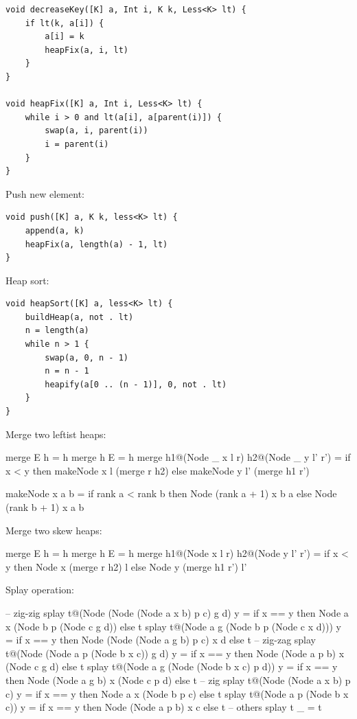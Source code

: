 \documentclass[b5paper]{article}
\begin{document}
\begin{lstlisting}[language = Bourbaki]
void decreaseKey([K] a, Int i, K k, Less<K> lt) {
    if lt(k, a[i]) {
        a[i] = k
        heapFix(a, i, lt)
    }
}

void heapFix([K] a, Int i, Less<K> lt) {
    while i > 0 and lt(a[i], a[parent(i)]) {
        swap(a, i, parent(i))
        i = parent(i)
    }
}
\end{lstlisting}

Push new element:

\begin{lstlisting}[language = Bourbaki]
void push([K] a, K k, less<K> lt) {
    append(a, k)
    heapFix(a, length(a) - 1, lt)
}
\end{lstlisting}

Heap sort:

\begin{lstlisting}[language = Bourbaki]
void heapSort([K] a, less<K> lt) {
    buildHeap(a, not . lt)
    n = length(a)
    while n > 1 {
        swap(a, 0, n - 1)
        n = n - 1
        heapify(a[0 .. (n - 1)], 0, not . lt)
    }
}
\end{lstlisting}

Merge two leftist heaps:

\begin{Haskell}
merge E h = h
merge h E = h
merge h1@(Node _ x l r) h2@(Node _ y l' r') =
    if x < y then makeNode x l (merge r h2)
    else makeNode y l' (merge h1 r')

makeNode x a b = if rank a < rank b then Node (rank a + 1) x b a
                 else Node (rank b + 1) x a b
\end{Haskell}

Merge two skew heaps:

\begin{Haskell}
merge E h = h
merge h E = h
merge h1@(Node x l r) h2@(Node y l' r') =
    if x < y then Node x (merge r h2) l
    else Node y (merge h1 r') l'
\end{Haskell}

Splay operation:

\begin{Haskell}
-- zig-zig
splay t@(Node (Node (Node a x b) p c) g d) y =
    if x == y then Node a x (Node b p (Node c g d)) else t
splay t@(Node a g (Node b p (Node c x d))) y =
    if x == y then Node (Node (Node a g b) p c) x d else t
-- zig-zag
splay t@(Node (Node a p (Node b x c)) g d) y =
    if x == y then Node (Node a p b) x (Node c g d) else t
splay t@(Node a g (Node (Node b x c) p d)) y =
    if x == y then Node (Node a g b) x (Node c p d) else t
-- zig
splay t@(Node (Node a x b) p c) y = if x == y then Node a x (Node b p c) else t
splay t@(Node a p (Node b x c)) y = if x == y then Node (Node a p b) x c else t
-- others
splay t _ = t
\end{Haskell}
\end{document}
